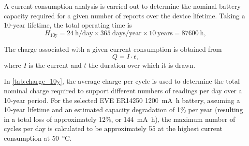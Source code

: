 

A current consumption analysis is carried out to determine the nominal battery capacity required for a given number of reports over the device lifetime. Taking a \num{10}-year lifetime, the total operating time is
\begin{equation}
    H_{10\text{y}} = 24~\text{h/day} \times 365~\text{days/year}
        \times 10~\text{years} = \SI{87600}{\hour},
\end{equation}

The charge associated with a given current consumption is obtained from
\begin{equation}
    Q = I \cdot t,
\end{equation}
where $I$ is the current and $t$ the duration over which it is drawn.

In \cref{tab:charge_10y}, the average charge per cycle is used to determine the total nominal charge required to support different numbers of readings per day over a 10-year period. For the selected EVE ER14250 \SI{1200}{\milli\ampere\hour} battery, assuming a 10-year lifetime and an estimated capacity degradation of 1\% per year (resulting in a total loss of approximately 12\%, or \SI{144}{\milli\ampere\hour}), the maximum number of cycles per day is calculated to be approximately 55 at the highest current consumption at \SI{50}{\celsius}.

